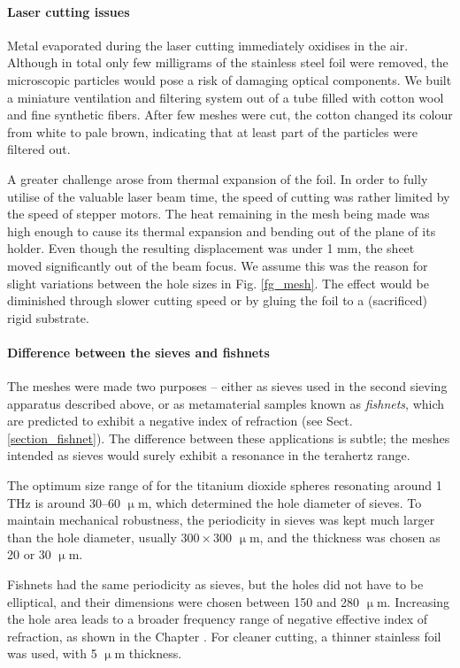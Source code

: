 \paragraph{Laser cutting issues}%
Metal evaporated during the laser cutting immediately oxidises in the air. Although in total only few milligrams of the stainless steel foil were removed, the microscopic particles would pose a risk of damaging optical components. We built a miniature ventilation and filtering system out of a tube filled with cotton wool and fine synthetic fibers. After few meshes were cut, the cotton changed its colour from white to pale brown, indicating that at least part of the particles were filtered out.

A greater challenge arose from thermal expansion of the foil. In order to fully utilise of the valuable laser beam time, the speed of cutting was rather limited by the speed of stepper motors. The heat remaining in the mesh being made was high enough to cause its thermal expansion and bending out of the plane of its holder. Even though the resulting displacement was under 1 mm, the sheet moved significantly out of the beam focus. We assume this was the reason for slight variations between the hole sizes in Fig. \ref{fg_mesh}. The effect would be diminished through slower cutting speed or by gluing the foil to a (sacrificed) rigid substrate.

\paragraph{Difference between the sieves and fishnets}%
The meshes were made two purposes -- either as sieves used in the second sieving apparatus described above, or as metamaterial samples known as \textit{fishnets}, which are predicted to exhibit a negative index of refraction (see Sect. \ref{section_fishnet}). The difference between these applications is subtle; the meshes intended as sieves would surely exhibit a resonance in the terahertz range. 

The optimum  size range of for the titanium dioxide spheres resonating around 1 THz is around 30--60 $\upmu$m, which determined the hole diameter of sieves. To maintain mechanical robustness, the periodicity in sieves was kept much larger than the hole diameter, usually $300\times 300$ $\upmu$m, and the thickness was chosen as 20 or 30 $\upmu$m.

Fishnets had the same periodicity as sieves, but the holes did not have to be elliptical, and their dimensions were chosen between 150 and 280 $\upmu$m. Increasing the hole area leads to a broader frequency range of negative effective index of refraction, as shown in the Chapter \pageref{section_fishnet}. For cleaner cutting, a thinner stainless foil was used, with 5 $\upmu$m thickness.

